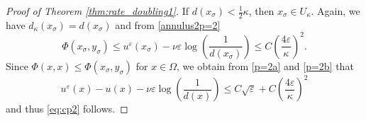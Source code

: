 \documentclass[12pt,reqno]{amsart}
\numberwithin{figure}{section}
\theoremstyle{plain}
\theoremstyle{remark}
\newtheorem{rem}{\bf{Remark}}
\numberwithin{equation}{section}
\begin{document}
\begin{proof}[Proof of Theorem \ref{thm:rate_doubling1}]
\noindent
If $d(x_\sigma)<\frac{1}{2}\kappa$, then $x_\sigma\in U_\kappa$. Again, we have $d_\kappa(x_\sigma) = d(x_\sigma)$ and from \eqref{annulus2p=2}
\begin{equation}\label{p=2b}
    \Phi(x_\sigma,y_\sigma) \leq u^\varepsilon(x_\sigma) - \nu \varepsilon \log\left(\frac{1}{d(x_\sigma)}\right) \leq  C\left(\frac{4\varepsilon}{\kappa}\right)^2. %
\end{equation}
Since $\Phi(x,x)\leq \Phi(x_\sigma,y_\sigma)$ for $x\in \Omega$, we obtain from \eqref{p=2a} and \eqref{p=2b} that
\begin{equation*}
    u^\varepsilon(x) - u(x) - \nu\varepsilon\log\left(\frac{1}{d(x)}\right) \leq C\sqrt{\varepsilon} +C\left(\frac{4\varepsilon}{\kappa}\right)^2
\end{equation*}
and thus \eqref{eq:cp2} follows.
\end{proof}


\end{document}
